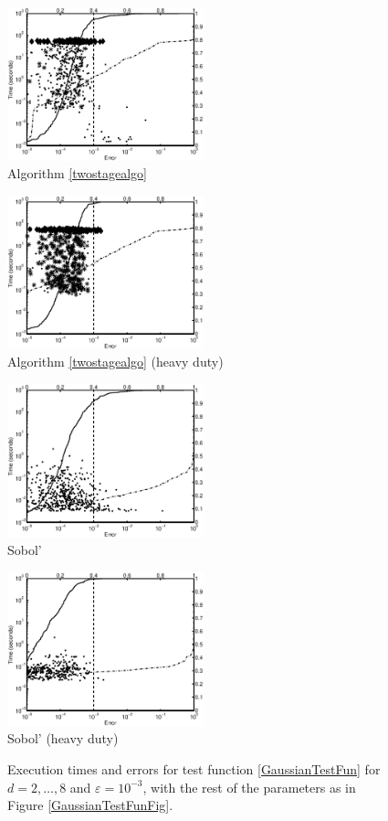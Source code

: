 \documentclass[graybox]{svmult}
\begin{document}
\begin{figure}
\centering
\begin{minipage}{5.7cm} \centering \includegraphics[width=5.7cm]{gaussiand=6iidErrTime.eps} \\ Algorithm \ref{twostagealgo} \end{minipage}
\begin{minipage}{5.7cm} \centering \includegraphics[width=5.7cm]{gaussiand=6iidheavyErrTime.eps} \\ Algorithm \ref{twostagealgo} (heavy duty) \end{minipage}
\begin{minipage}{5.7cm} \centering \includegraphics[width=5.7cm]{gaussiand=6SobolErrTime.eps} \\ Sobol' \end{minipage}
\begin{minipage}{5.7cm} \centering \includegraphics[width=5.7cm]{gaussiand=6SobolheavyErrTime.eps} \\ Sobol' (heavy duty) \end{minipage}
\caption{Execution times and errors for test function \eqref{GaussianTestFun} for $d=2, \ldots, 8$ and $\varepsilon=10^{-3}$, with the rest of the parameters as in Figure \ref{GaussianTestFunFig}.\label{GaussianTestFunHDFig}}
\end{figure}
\end{document}

